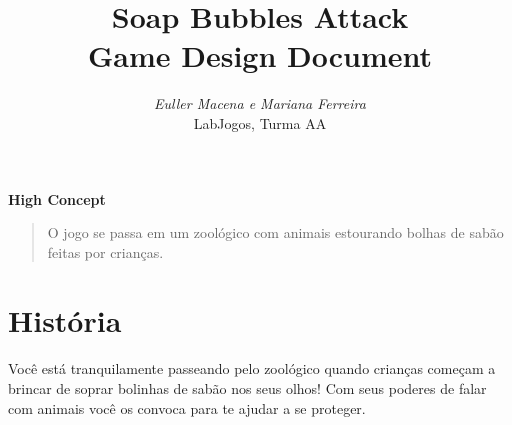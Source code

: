 \documentclass[a4paper,draft,12pt]{article}
\begin{document}
\thispagestyle{empty}
\baselineskip 7.5mm %

\title{\bf Soap Bubbles Attack \\ \vspace{3mm}\large Game Design Document}
\author{\emph{Euller Macena e Mariana Ferreira}\\ \small LabJogos, Turma AA}
\date{ }

\maketitle

%

\vfill

\bigskip
\bigskip

\begin{center}
{\bf\large High Concept}
\bigskip

{\parbox{13cm}{\begin{quotation}\large O jogo se passa em um zoológico com animais estourando bolhas de sabão feitas por crianças.\end{quotation}}}
\end{center}

\bigskip
\bigskip

\vfill

\section{História}

Você está tranquilamente passeando pelo zoológico quando crianças começam a brincar de soprar bolinhas de sabão nos seus olhos! Com seus poderes de falar com animais você os convoca para te ajudar a se proteger.

\vfill
\end{document}
